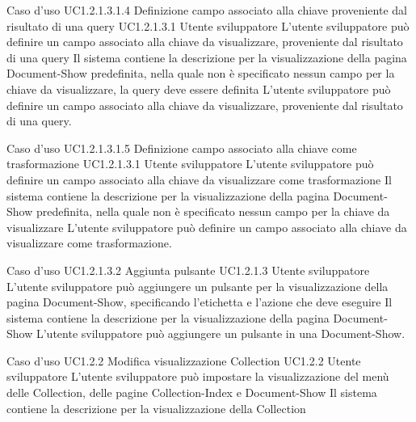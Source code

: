 \UCtitle
{Caso d'uso UC1.2.1.3.1.4}
{Definizione campo associato alla chiave proveniente dal risultato di una query}
\UC
{UC1.2.1.3.1}
{Utente sviluppatore}
{L'utente sviluppatore può definire un campo associato alla chiave da visualizzare, proveniente dal risultato di una query}
{Il sistema contiene la descrizione per la visualizzazione della pagina Document-Show predefinita, nella quale non è specificato nessun campo per la chiave da visualizzare, la query deve essere definita}
\scenario
{L'utente sviluppatore può definire un campo associato alla chiave da visualizzare, proveniente dal risultato di una query.}

\UCtitle
{Caso d'uso UC1.2.1.3.1.5}
{Definizione campo associato alla chiave come trasformazione}
\UC
{UC1.2.1.3.1}
{Utente sviluppatore}
{L'utente sviluppatore può definire un campo associato alla chiave da visualizzare come trasformazione}
{Il sistema contiene la descrizione per la visualizzazione della pagina Document-Show predefinita, nella quale non è specificato nessun campo per la chiave da visualizzare}
\scenario
{L'utente sviluppatore può definire un campo associato alla chiave da visualizzare come trasformazione.}

\UCtitle
{Caso d'uso UC1.2.1.3.2}
{Aggiunta pulsante}
\UC
{UC1.2.1.3}
{Utente sviluppatore}
{L'utente sviluppatore può aggiungere un pulsante per la visualizzazione della pagina Document-Show, specificando l'etichetta e l'azione che deve eseguire}
{Il sistema contiene la descrizione per la visualizzazione della pagina Document-Show}
\scenario
{L'utente sviluppatore può aggiungere un pulsante in una Document-Show.}

\UCtitle
{Caso d'uso UC1.2.2}
{Modifica visualizzazione Collection}
\UC
{UC1.2.2}
{Utente sviluppatore}
{L'utente sviluppatore  può impostare la visualizzazione del menù delle Collection, delle pagine Collection-Index e Document-Show}
{Il sistema contiene la descrizione per la visualizzazione della Collection}

